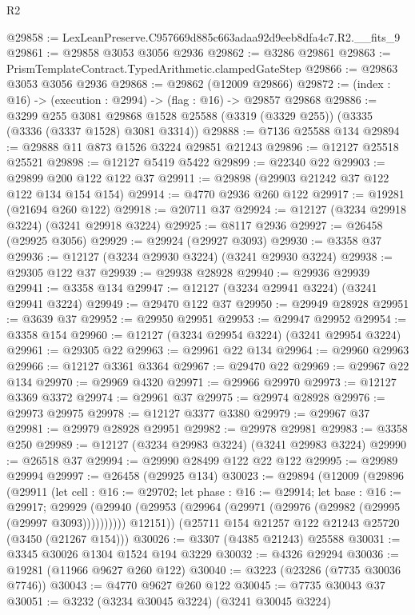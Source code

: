 \begin{lexlean}{R2}
\begin{coremodule}
@29858 := LexLeanPreserve.C957669d885c663adaa92d9eeb8dfa4c7.R2.__fits_9
@29861 := @29858 @3053 @3056 @2936
@29862 := @3286 @29861
@29863 := PrismTemplateContract.TypedArithmetic.clampedGateStep
@29866 := @29863 @3053 @3056 @2936
@29868 := @29862 (@12009 @29866)
@29872 := (index : @16) -> (execution : @2994) -> (flag : @16) -> @29857 @29868
@29886 := @3299
    @255
    @3081
    @29868
    @1528
    @25588
    (@3319 (@3329 @255))
    (@3335 (@3336 (@3337 @1528) @3081 @3314))
@29888 := @7136 @25588 @134
@29894 := @29888 @11 @873 @1526 @3224 @29851 @21243
@29896 := @12127 @25518 @25521
@29898 := @12127 @5419 @5422
@29899 := @22340 @22
@29903 := @29899 @200 @122 @122 @37
@29911 := @29898 (@29903 @21242 @37 @122 @122 @134 @154 @154)
@29914 := @4770 @2936 @260 @122
@29917 := @19281 (@21694 @260 @122)
@29918 := @20711 @37
@29924 := @12127 (@3234 @29918 @3224) (@3241 @29918 @3224)
@29925 := @8117 @2936
@29927 := @26458 (@29925 @3056)
@29929 := @29924 (@29927 @3093)
@29930 := @3358 @37
@29936 := @12127 (@3234 @29930 @3224) (@3241 @29930 @3224)
@29938 := @29305 @122 @37
@29939 := @29938 @28928
@29940 := @29936 @29939
@29941 := @3358 @134
@29947 := @12127 (@3234 @29941 @3224) (@3241 @29941 @3224)
@29949 := @29470 @122 @37
@29950 := @29949 @28928
@29951 := @3639 @37
@29952 := @29950 @29951
@29953 := @29947 @29952
@29954 := @3358 @154
@29960 := @12127 (@3234 @29954 @3224) (@3241 @29954 @3224)
@29961 := @29305 @22
@29963 := @29961 @22 @134
@29964 := @29960 @29963
@29966 := @12127 @3361 @3364
@29967 := @29470 @22
@29969 := @29967 @22 @134
@29970 := @29969 @4320
@29971 := @29966 @29970
@29973 := @12127 @3369 @3372
@29974 := @29961 @37
@29975 := @29974 @28928
@29976 := @29973 @29975
@29978 := @12127 @3377 @3380
@29979 := @29967 @37
@29981 := @29979 @28928 @29951
@29982 := @29978 @29981
@29983 := @3358 @250
@29989 := @12127 (@3234 @29983 @3224) (@3241 @29983 @3224)
@29990 := @26518 @37
@29994 := @29990 @28499 @122 @22 @122
@29995 := @29989 @29994
@29997 := @26458 (@29925 @134)
@30023 := @29894
    (@12009
      (@29896
        (@29911
          (let cell : @16 := @29702;
          let phase : @16 := @29914;
          let base : @16 := @29917;
          @29929 (@29940 (@29953 (@29964 (@29971 (@29976 (@29982 (@29995 (@29997 @3093))))))))))
        @12151))
    (@25711 @154 @21257 @122 @21243 @25720 (@3450 (@21267 @154)))
@30026 := @3307 (@4385 @21243) @25588
@30031 := @3345 @30026 @1304 @1524 @194 @3229
@30032 := @4326 @29294
@30036 := @19281 (@11966 @9627 @260 @122)
@30040 := @3223 (@23286 (@7735 @30036 @7746))
@30043 := @4770 @9627 @260 @122
@30045 := @7735 @30043 @37
@30051 := @3232 (@3234 @30045 @3224) (@3241 @30045 @3224)

\end{coremodule}
\end{lexlean}
